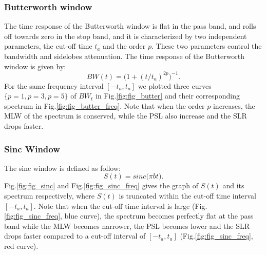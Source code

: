 \documentclass[useAMS,usenatbib]{mn2e}
\begin{document}
\subsubsection{Butterworth window}
The time response of the Butterworth window is flat  in the pass band, and rolls off towards zero in the stop band, and it is 
characterized by two independent parameters, the cut-off time $t_a$ and the order $p$. These two parameters control the 
bandwidth and sidelobes  attenuation. The time response of the Butterworth window is given by:
\begin{equation}
BW(t)= \Big(1 + (t/t_a)^{2p}\Big)^{-1}.
\end{equation}
For the same frequency interval $[-t_a,t_a]$ we plotted  three curves $\{p=1, p=3, p=5\}$ of $BW_{t}$ in Fig.\ref{fig:fig_butter} and 
their corresponding spectrum in Fig.\ref{fig:fig_butter_freq}. Note that when the order $p$ increases, the MLW of the 
spectrum is conserved, while the PSL also increase and the SLR drops faster.
\subsubsection{Sinc Window}
The sinc window is defined as follow:
\begin{equation}
S(t)= sinc\big(\pi b t\big).
\end{equation}
 Fig.\ref{fig:fig_sinc} and Fig.\ref{fig:fig_sinc_freq} gives the graph of $S(t)$ and its spectrum respectively, where 
$S(t)$ is truncated within the cut-off time interval $[-t_a,t_a]$. Note that when the cut-off time interval is large 
(Fig.\ref{fig:fig_sinc_freq}, blue curve), the spectrum becomes perfectly flat at the pass band while the MLW becomes narrower,  the PSL 
becomes lower and the SLR drops faster compared to a cut-off interval of $[-t_a,t_a]$ (Fig.\ref{fig:fig_sinc_freq}, red curve). 
\end{document}
